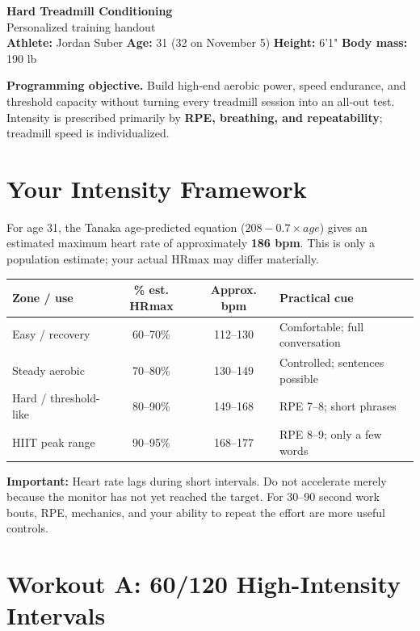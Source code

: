 \documentclass[11pt]{article}
\begin{document}
{\color{navy}\Huge\bfseries Hard Treadmill Conditioning}\\[3pt]
{\Large Personalized training handout}\\[7pt]
{\color{graytext}\textbf{Athlete:} Jordan Suber \quad
\textbf{Age:} 31 (32 on November 5) \quad
\textbf{Height:} 6'1" \quad
\textbf{Body mass:} 190 lb}

\begin{tcolorbox}[colback=light,colframe=navy,boxrule=0.8pt,arc=2mm]
\textbf{Programming objective.}
Build high-end aerobic power, speed endurance, and threshold capacity without turning every treadmill session into an all-out test. Intensity is prescribed primarily by \textbf{RPE, breathing, and repeatability}; treadmill speed is individualized.
\end{tcolorbox}

\section{Your Intensity Framework}

For age 31, the Tanaka age-predicted equation ($208-0.7\times age$) gives an estimated maximum heart rate of approximately \textbf{186 bpm}. This is only a population estimate; your actual HRmax may differ materially.

\begin{center}
\begin{tabularx}{\textwidth}{@{}l c c Y@{}}
\toprule
\textbf{Zone / use} & \textbf{\% est. HRmax} & \textbf{Approx. bpm} & \textbf{Practical cue}\\
\midrule
Easy / recovery & 60--70\% & 112--130 & Comfortable; full conversation\\
Steady aerobic & 70--80\% & 130--149 & Controlled; sentences possible\\
Hard / threshold-like & 80--90\% & 149--168 & RPE 7--8; short phrases\\
HIIT peak range & 90--95\% & 168--177 & RPE 8--9; only a few words\\
\bottomrule
\end{tabularx}
\end{center}

\textbf{Important:} Heart rate lags during short intervals. Do not accelerate merely because the monitor has not yet reached the target. For 30--90 second work bouts, RPE, mechanics, and your ability to repeat the effort are more useful controls.

\section{Workout A: 60/120 High-Intensity Intervals}
\end{document}
